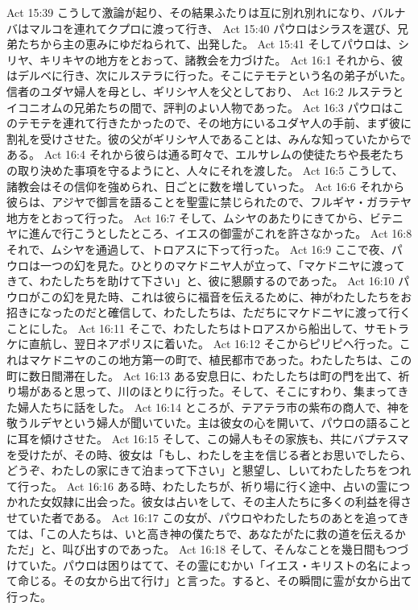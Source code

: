 Act 15:39  こうして激論が起り、その結果ふたりは互に別れ別れになり、バルナバはマルコを連れてクプロに渡って行き、
Act 15:40  パウロはシラスを選び、兄弟たちから主の恵みにゆだねられて、出発した。
Act 15:41  そしてパウロは、シリヤ、キリキヤの地方をとおって、諸教会を力づけた。
Act 16:1  それから、彼はデルベに行き、次にルステラに行った。そこにテモテという名の弟子がいた。信者のユダヤ婦人を母とし、ギリシヤ人を父としており、
Act 16:2  ルステラとイコニオムの兄弟たちの間で、評判のよい人物であった。
Act 16:3  パウロはこのテモテを連れて行きたかったので、その地方にいるユダヤ人の手前、まず彼に割礼を受けさせた。彼の父がギリシヤ人であることは、みんな知っていたからである。
Act 16:4  それから彼らは通る町々で、エルサレムの使徒たちや長老たちの取り決めた事項を守るようにと、人々にそれを渡した。
Act 16:5  こうして、諸教会はその信仰を強められ、日ごとに数を増していった。
Act 16:6  それから彼らは、アジヤで御言を語ることを聖霊に禁じられたので、フルギヤ・ガラテヤ地方をとおって行った。
Act 16:7  そして、ムシヤのあたりにきてから、ビテニヤに進んで行こうとしたところ、イエスの御霊がこれを許さなかった。
Act 16:8  それで、ムシヤを通過して、トロアスに下って行った。
Act 16:9  ここで夜、パウロは一つの幻を見た。ひとりのマケドニヤ人が立って、「マケドニヤに渡ってきて、わたしたちを助けて下さい」と、彼に懇願するのであった。
Act 16:10  パウロがこの幻を見た時、これは彼らに福音を伝えるために、神がわたしたちをお招きになったのだと確信して、わたしたちは、ただちにマケドニヤに渡って行くことにした。
Act 16:11  そこで、わたしたちはトロアスから船出して、サモトラケに直航し、翌日ネアポリスに着いた。
Act 16:12  そこからピリピへ行った。これはマケドニヤのこの地方第一の町で、植民都市であった。わたしたちは、この町に数日間滞在した。
Act 16:13  ある安息日に、わたしたちは町の門を出て、祈り場があると思って、川のほとりに行った。そして、そこにすわり、集まってきた婦人たちに話をした。
Act 16:14  ところが、テアテラ市の紫布の商人で、神を敬うルデヤという婦人が聞いていた。主は彼女の心を開いて、パウロの語ることに耳を傾けさせた。
Act 16:15  そして、この婦人もその家族も、共にバプテスマを受けたが、その時、彼女は「もし、わたしを主を信じる者とお思いでしたら、どうぞ、わたしの家にきて泊まって下さい」と懇望し、しいてわたしたちをつれて行った。
Act 16:16  ある時、わたしたちが、祈り場に行く途中、占いの霊につかれた女奴隷に出会った。彼女は占いをして、その主人たちに多くの利益を得させていた者である。
Act 16:17  この女が、パウロやわたしたちのあとを追ってきては、「この人たちは、いと高き神の僕たちで、あなたがたに救の道を伝えるかただ」と、叫び出すのであった。
Act 16:18  そして、そんなことを幾日間もつづけていた。パウロは困りはてて、その霊にむかい「イエス・キリストの名によって命じる。その女から出て行け」と言った。すると、その瞬間に霊が女から出て行った。
